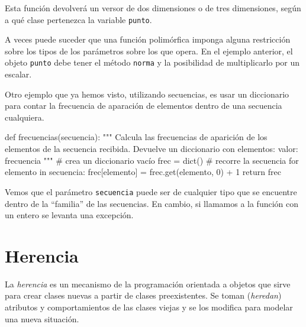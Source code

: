 Esta función devolverá un versor de dos dimensiones o de tres dimensiones,
según a qué clase pertenezca la variable \lstinline!punto!.

\begin{atencion}
A veces puede suceder que una función polimórfica imponga alguna
restricción sobre los tipos de los parámetros sobre los que opera. En el
ejemplo anterior, el objeto \lstinline!punto! debe tener el método
\lstinline!norma! y la posibilidad de multiplicarlo por un escalar.
\end{atencion}

Otro ejemplo que ya hemos visto, utilizando secuencias, es usar un
diccionario para contar la frecuencia de aparación de elementos dentro de
una secuencia cualquiera.

\begin{codigo-python}
def frecuencias(secuencia):
    """ Calcula las frecuencias de aparición de los elementos de
        la secuencia recibida.
        Devuelve un diccionario con elementos: {valor: frecuencia}
    """
    # crea un diccionario vacío
    frec = dict()
    # recorre la secuencia
    for elemento in secuencia:
        frec[elemento] = frec.get(elemento, 0) + 1
    return frec
\end{codigo-python}

Vemos que el parámetro \lstinline!secuencia! puede ser de cualquier tipo
que se encuentre dentro de la ``familia'' de las secuencias. En cambio, si
llamamos a la función con un entero se levanta una excepción.


\section{Herencia}

La {\it herencia} es un mecanismo de la programación orientada a objetos que
sirve para crear clases nuevas a partir de clases preexistentes.  Se toman
({\it heredan}) atributos y comportamientos de las clases viejas y se los
modifica para modelar una nueva situación.

